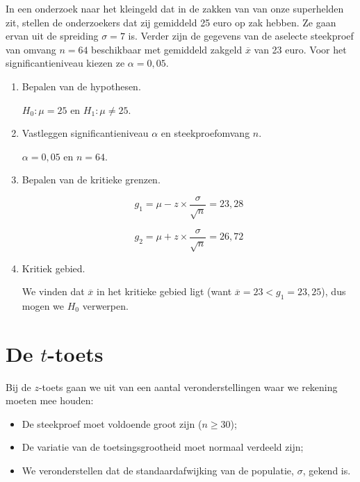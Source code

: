 \begin{example}
  In een onderzoek naar het kleingeld dat in de zakken van van onze superhelden zit, stellen de onderzoekers dat zij gemiddeld 25 euro op zak hebben. Ze gaan ervan uit de spreiding $\sigma = 7$ is. Verder zijn de gegevens van de aselecte steekproef van omvang $n=64$ beschikbaar met gemiddeld zakgeld $\overline{x}$ van 23 euro. Voor het significantieniveau kiezen ze $\alpha = 0,05$.
  
  \begin{enumerate}
    \item Bepalen van de hypothesen.
    
    $H_{0} : \mu = 25$ en $H_{1}: \mu \neq 25$.
    
    \item Vastleggen significantieniveau $\alpha$ en steekproefomvang $n$.
    
    $\alpha = 0,05$ en $n=64$.
    
    \item Bepalen van de kritieke grenzen.
    
    \[ g_{1} = \mu - z \times \frac{\sigma}{\sqrt{n}} = 23,28 \]
    
    \[ g_{2} = \mu + z \times \frac{\sigma}{\sqrt{n}} = 26,72 \]
    
    \item Kritiek gebied.
    
    We vinden dat $\overline{x}$ in het kritieke gebied ligt (want $\overline{x} = 23 < g_1 = 23,25$), dus mogen we $H_{0}$ verwerpen.
    
  \end{enumerate}
\end{example}

\section{De \texorpdfstring{$t$}{t}-toets}
\label{sec:t-toets}

Bij de $z$-toets gaan we uit van een aantal veronderstellingen waar we rekening moeten mee houden:

\begin{itemize}
  \item De steekproef moet voldoende groot zijn ($n \ge 30$);
  \item De variatie van de toetsingsgrootheid moet normaal verdeeld zijn;
  \item We veronderstellen dat de standaardafwijking van de populatie, $\sigma$, gekend is.
\end{itemize}

